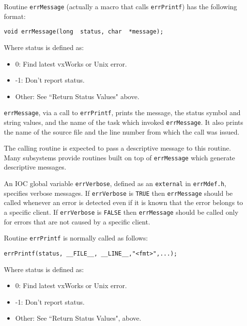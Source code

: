 Routine \verb|errMessage| (actually a macro that calls \verb|errPrintf|) has the following format:

\begin{verbatim}
void errMessage(long  status, char  *message);
\end{verbatim}

Where status is defined as:

\begin{itemize}
\item 0:  Find latest vxWorks or Unix error.

\item -1:  Don't report status.

\item Other:  See ``Return Status Values" above.

\end{itemize}

\verb|errMessage|, via a call to \verb|errPrintf|, prints the message, the status symbol and string values, and the name of the task 
which invoked \verb|errMessage|. It also prints the name of the source file and the line number from which the call was 
issued.

The calling routine is expected to pass a descriptive message to this routine. Many subsystems provide routines built on 
top of \verb|errMessage| which generate descriptive messages. 

An IOC global variable \verb|errVerbose|, defined as an \verb|external| in \verb|errMdef.h|, specifies verbose messages. If 
\verb|errVerbose| is \verb|TRUE| then \verb|errMessage| should be called whenever an error is detected even if it is known that the 
error belongs to a specific client. If \verb|errVerbose| is \verb|FALSE| then \verb|errMessage| should be called only for errors that are 
not caused by a specific client.

Routine \verb|errPrintf| is normally called as follows:

\begin{verbatim}
errPrintf(status, __FILE__, __LINE__,"<fmt>",...);
\end{verbatim}

Where status is defined as:

\begin{itemize}
\item 0:  Find latest vxWorks or Unix error.

\item -1:  Don't report status.

\item Other:  See ``Return Status Values", above.

\end{itemize}

